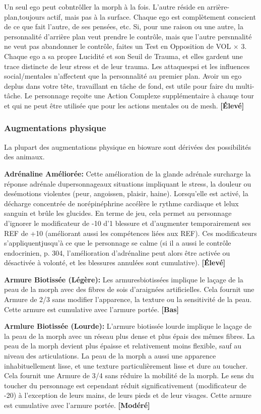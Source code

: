 {{Un seul ego peut cobntrôller la morph à la fois. L'autre réside en arrière-plan,toujours actif, mais pas à la surface. Chaque ego est complètement conscient de ce que fait l'autre, de ses pensées, etc. Si, pour une raison ou une autre, la personnalité d'arrière plan veut prendre le contrôle, mais que l'autre persnnalité ne veut pas abandonner le contrôle, faites un Test en Opposition de VOL $\times$ 3. Chaque ego a sa propre Lucidité et son Seuil de Trauma, et elles gardent une trace distincte de leur stress et de leur trauma. Les attaquespsi et les influences social/mentales n'affectent que la personnalité au premier plan. Avoir un ego deplus dans votre tête, travaillant en tâche de fond, est utile pour faire du multi-tâche. Le personnage reçoite une Action Complexe supplémentaire à chauqe tour et qui ne peut être utilisée que pour les actions mentales ou de mesh. \textbf{[Élevé]} 

\subsubsection{Augmentations physique} 

La plupart des augmentations physique en bioware sont dérivées des possibilités des animaux. 

\textbf{Adrénaline Améliorée:} Cette amélioration de la glande adrénale surcharge la réponse adrénale dupersonnageaux situations impliquant le stress, la douleur ou desémotions violentes (peur, angoissen, plaisir, haine). Lorsqu'elle est activé, la décharge concentrée de norépinéphrine accélère le rythme cardiaque et lelux sanguin et brûle les glucides. En terme de jeu, cela permet au personnage d'ignorer le modificateur de -10 d'1 blessure et d'augmenter temporairement ses REF de +10 (améliorant aussi les compétences liées aux REF). Ces modificateurs s'appliquentjusqu'à ce que le personnage se calme (si il a aussi le contrôle endocrinien, p. 304, l'amélioration d'adrénaline peut alors être activée ou désactivée à volonté, et les blessures annulées sont cumulative). \textbf{[Élevé]} 

\textbf{Armure Biotissée (Légère):} Les armuresbiotissées implique le laçage de la peau de la morph avec des fibres de sois d'araignées artificielles. Cela fournit une Armure de 2/3 sans modifier l'apparence, la texture ou la sensitivité de la peau. Cette armure est cumulative avec l'armure portée. \textbf{[Bas]} 

\textbf{Armlure Biotissée (Lourde):} L'armure biotissée lourde implique le laçage de la peau de la morph avec un réseau plus dense et plus épais des mêmes fibres. La peau de la morph devient plus épaisse et relativement moins flexible, sauf au niveau des articulations. La peau de la morph a aussi une apparence inhabituellement lisse, et une texture particulièrement lisse et dure au toucher. Cela fournit une Armure de 3/4 sans réduire la mobilité de la morph. Le sens du toucher du personnage est cependant réduit significativement (modificateur de -20) à l'exception de leurs mains, de leurs pieds et de leur visages. Cette armure est cumulative avec l'armure portée. \textbf{[Modéré]} 

}}

